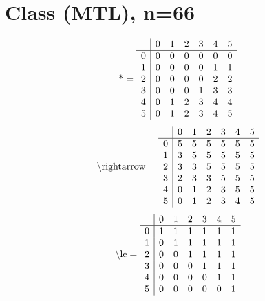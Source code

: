 \documentclass[11pt]{article}
\begin{document}
\section{Class (MTL), n=66}
\[\text{*} = 
\begin{array}{r | r r r r r r}
 & 0 & 1 & 2 & 3 & 4 & 5 \\ \hline
0 & 0 & 0 & 0 & 0 & 0 & 0 \\
1 & 0 & 0 & 0 & 0 & 1 & 1 \\
2 & 0 & 0 & 0 & 0 & 2 & 2 \\
3 & 0 & 0 & 0 & 1 & 3 & 3 \\
4 & 0 & 1 & 2 & 3 & 4 & 4 \\
5 & 0 & 1 & 2 & 3 & 4 & 5 \\
\end{array}
\]
\[\text{\textbackslash rightarrow} = 
\begin{array}{r | r r r r r r}
 & 0 & 1 & 2 & 3 & 4 & 5 \\ \hline
0 & 5 & 5 & 5 & 5 & 5 & 5 \\
1 & 3 & 5 & 5 & 5 & 5 & 5 \\
2 & 3 & 3 & 5 & 5 & 5 & 5 \\
3 & 2 & 3 & 3 & 5 & 5 & 5 \\
4 & 0 & 1 & 2 & 3 & 5 & 5 \\
5 & 0 & 1 & 2 & 3 & 4 & 5 \\
\end{array}
\]
\[\text{\textbackslash le} = 
\begin{array}{r | r r r r r r}
 & 0 & 1 & 2 & 3 & 4 & 5 \\ \hline
0 & 1 & 1 & 1 & 1 & 1 & 1 \\
1 & 0 & 1 & 1 & 1 & 1 & 1 \\
2 & 0 & 0 & 1 & 1 & 1 & 1 \\
3 & 0 & 0 & 0 & 1 & 1 & 1 \\
4 & 0 & 0 & 0 & 0 & 1 & 1 \\
5 & 0 & 0 & 0 & 0 & 0 & 1 \\
\end{array}
\]
\end{document}
